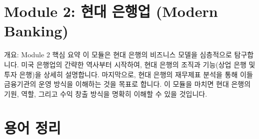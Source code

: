 \documentclass[11pt,a4paper]{article}
\begin{document}
\newpage
\section*{\centering Module 2: 현대 은행업 (Modern Banking)}

\begin{summarybox}{개요: Module 2 핵심 요약}
이 모듈은 현대 은행의 비즈니스 모델을 심층적으로 탐구합니다. 미국 은행업의 간략한 역사부터 시작하여, 현대 은행의 조직과 기능(상업 은행 및 투자 은행)을 상세히 설명합니다. 마지막으로, 현대 은행의 재무제표 분석을 통해 이들 금융기관의 운영 방식을 이해하는 것을 목표로 합니다. 이 모듈을 마치면 현대 은행의 기원, 역할, 그리고 수익 창출 방식을 명확히 이해할 수 있을 것입니다.
\end{summarybox}

\newpage
\section*{용어 정리}
\end{document}
